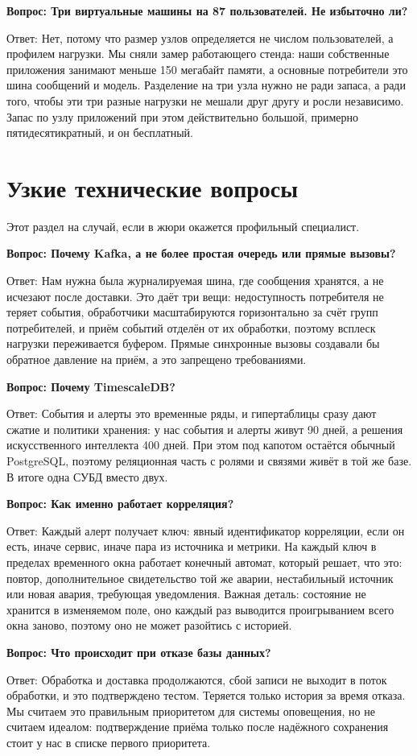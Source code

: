 \documentclass[11pt]{article}
\newcommand{\qa}[2]{%
\par\vspace{7pt}%
{\bfseries Вопрос: #1}\par\vspace{2pt}
{Ответ: #2}\par\vspace{4pt}}
\begin{document}
\qa{Три виртуальные машины на 87 пользователей. Не избыточно ли?}
{Нет, потому что размер узлов определяется не числом пользователей, а
профилем нагрузки. Мы сняли замер работающего стенда: наши собственные
приложения занимают меньше 150 мегабайт памяти, а основные потребители это
шина сообщений и модель. Разделение на три узла нужно не ради запаса, а ради
того, чтобы эти три разные нагрузки не мешали друг другу и росли независимо.
Запас по узлу приложений при этом действительно большой, примерно
пятидесятикратный, и он бесплатный.}

\section{Узкие технические вопросы}

Этот раздел на случай, если в жюри окажется профильный специалист.

\qa{Почему Kafka, а не более простая очередь или прямые вызовы?}
{Нам нужна была журналируемая шина, где сообщения хранятся, а не исчезают
после доставки. Это даёт три вещи: недоступность потребителя не теряет
события, обработчики масштабируются горизонтально за счёт групп потребителей,
и приём событий отделён от их обработки, поэтому всплеск нагрузки переживается
буфером. Прямые синхронные вызовы создавали бы обратное давление на приём, а
это запрещено требованиями.}

\qa{Почему TimescaleDB?}
{События и алерты это временные ряды, и гипертаблицы сразу дают сжатие и
политики хранения: у нас события и алерты живут 90 дней, а решения
искусственного интеллекта 400 дней. При этом под капотом остаётся обычный
PostgreSQL, поэтому реляционная часть с ролями и связями живёт в той же базе.
В итоге одна СУБД вместо двух.}

\qa{Как именно работает корреляция?}
{Каждый алерт получает ключ: явный идентификатор корреляции, если он есть,
иначе сервис, иначе пара из источника и метрики. На каждый ключ в пределах
временного окна работает конечный автомат, который решает, что это: повтор,
дополнительное свидетельство той же аварии, нестабильный источник или новая
авария, требующая уведомления. Важная деталь: состояние не хранится в
изменяемом поле, оно каждый раз выводится проигрыванием всего окна заново,
поэтому оно не может разойтись с историей.}

\qa{Что происходит при отказе базы данных?}
{Обработка и доставка продолжаются, сбой записи не выходит в поток обработки,
и это подтверждено тестом. Теряется только история за время отказа. Мы
считаем это правильным приоритетом для системы оповещения, но не считаем
идеалом: подтверждение приёма только после надёжного сохранения стоит у нас в
списке первого приоритета.}
\end{document}
